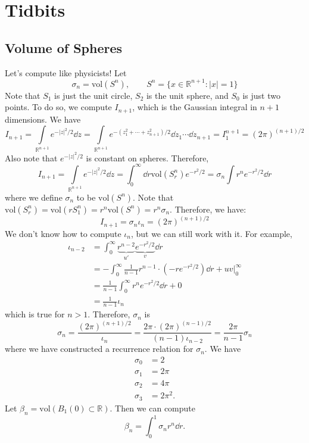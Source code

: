 \documentclass{article}
\numberwithin{equation}{section}
\begin{document}
\section{Tidbits}
\subsection{Volume of Spheres}
Let's compute like physicists! Let
\begin{equation}
    \sigma_n = \text{vol}(S^n),\quad\quad S^n = \{x \in \mathbb{R}^{n+1}: |x|=1\}
\end{equation}
Note that $S_1$ is just the unit circle, $S_2$ is the unit sphere, and $S_0$ is just two points. To do so, we compute $I_{n+1}$, which is the Gaussian integral in $n+1$ dimensions. We have 
\begin{equation}
    I_{n+1} = \int\limits_{\mathbb{R}^{n+1}} e^{-|z|^2/2} \dd{z} = \int\limits_{\mathbb{R}^{n+1}} e^{-(z_1^2+\cdots+z_{n+1}^2)/2}\dd{z}_1\cdots \dd{z}_{n+1} = I_1^{n+1} = \left(2\pi\right)^{(n+1)/2}
\end{equation}
Also note that $e^{-|z|^2/2}$ is constant on spheres. Therefore, 
\begin{equation}
    I_{n+1} = \int\limits_{\mathbb{R}^{n+1}}e^{-|z|^2/2}\dd{z} = \int_0^\infty \dd{r} \text{vol}(S^n_r)e^{-r^2/2} = \sigma_n \int r^n e^{-r^2/2} \dd{r}
\end{equation}
where we define $\sigma_n$ to be $\text{vol}(S^n)$. Note that $\text{vol}(S_r^n) = \text{vol}(rS_1^n)=r^n\text{vol}(S^n) = r^n \sigma_n.$ Therefore, we have:
\begin{equation}
    I_{n+1} = \sigma_n \iota_n = (2\pi)^{(n+1)/2}
\end{equation}
We don't know how to compute $\iota_n$, but we can still work with it. For example, 
\begin{align}
    \iota_{n-2} &= \int_0^\infty \underbrace{r^{n-2}}_{u'}\underbrace{e^{-r^2/2}}_{v}\dd{r} \\ 
    &= -\int_0^\infty \frac{1}{n-1}r^{n-1} \cdot \left(-re^{-r^2/2}\right) \dd{r}  + uv\Big|_0^\infty \\ 
    &= \frac{1}{n-1} \int_0^\infty r^n e^{-r^2/2}\dd{r} + 0 \\
    &= \frac{1}{n-1}\iota_n 
\end{align}
which is true for $n>1.$ Therefore, $\sigma_n$ is
\begin{equation}
    \sigma_n = \frac{(2\pi)^{(n+1)/2}}{\iota_n} = \frac{2\pi \cdot (2\pi)^{(n-1)/2}}{(n-1)\iota_{n-2}} = \frac{2\pi}{n-1}\sigma_n 
\end{equation}
where we have constructed a recurrence relation for $\sigma_n$. We have
\begin{align}
    \sigma_0 &= 2 \\ 
    \sigma_1 &= 2\pi \\ 
    \sigma_2 &= 4\pi \\
    \sigma_3 &= 2\pi^2.
\end{align}
Let $\beta_n = \text{vol}(B_1(0) \subset \mathbb{R}).$ Then we can compute
\begin{equation}
    \beta_n = \int_0^1 \sigma_nr^n \dd{r}.
\end{equation}
\end{document}
